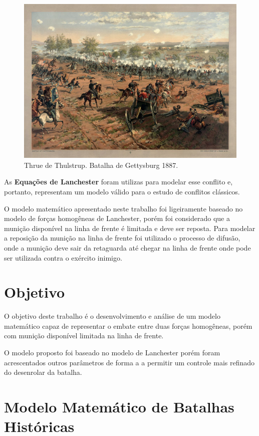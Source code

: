 \documentclass{article}
\begin{document}
\begin{figure}[ht]
	\centering
	\includegraphics[width=0.7\linewidth]{figs/Battle_of_Gettysburg_1200x870.jpg}
	\caption{Thrue de Thulstrup. Batalha de Gettysburg 1887.}
	\label{fig:gettysburg-battle}	
\end{figure}

As \textbf{Equações de Lanchester} foram utilizas para modelar esse conflito e, portanto, representam um modelo válido para o estudo de conflitos clássicos.

O modelo matemático apresentado neste trabalho foi ligeiramente baseado no modelo de forças homogêneas de Lanchester, porém foi considerado que a munição disponível na linha de frente é limitada e deve ser reposta. Para modelar a reposição da munição na linha de frente foi utilizado o processo de difusão, onde a munição deve sair da retaguarda até chegar na linha de frente onde pode ser utilizada contra o exército inimigo.

\section{Objetivo}

O objetivo deste trabalho é o desenvolvimento e análise de um modelo matemático capaz de representar o embate entre duas forças homogêneas, porém com munição disponível limitada na linha de frente. 

O modelo proposto foi baseado no modelo de Lanchester porém foram acrescentados outros parâmetros de forma a a permitir um controle mais refinado do desenrolar da batalha. 

\section{Modelo Matemático de Batalhas Históricas}
\end{document}
